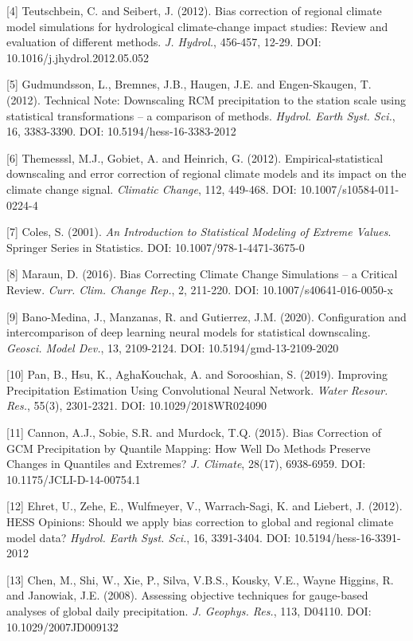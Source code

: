 \documentclass[
]{article}
\begin{document}
{[}4{]} Teutschbein, C. and Seibert, J. (2012). Bias correction of
regional climate model simulations for hydrological climate-change
impact studies: Review and evaluation of different methods. \emph{J.
Hydrol.}, 456-457, 12-29. DOI: 10.1016/j.jhydrol.2012.05.052

{[}5{]} Gudmundsson, L., Bremnes, J.B., Haugen, J.E. and Engen-Skaugen,
T. (2012). Technical Note: Downscaling RCM precipitation to the station
scale using statistical transformations -- a comparison of methods.
\emph{Hydrol. Earth Syst. Sci.}, 16, 3383-3390. DOI:
10.5194/hess-16-3383-2012

{[}6{]} Themesssl, M.J., Gobiet, A. and Heinrich, G. (2012).
Empirical-statistical downscaling and error correction of regional
climate models and its impact on the climate change signal.
\emph{Climatic Change}, 112, 449-468. DOI: 10.1007/s10584-011-0224-4

{[}7{]} Coles, S. (2001). \emph{An Introduction to Statistical Modeling
of Extreme Values}. Springer Series in Statistics. DOI:
10.1007/978-1-4471-3675-0

{[}8{]} Maraun, D. (2016). Bias Correcting Climate Change Simulations --
a Critical Review. \emph{Curr. Clim. Change Rep.}, 2, 211-220. DOI:
10.1007/s40641-016-0050-x

{[}9{]} Bano-Medina, J., Manzanas, R. and Gutierrez, J.M. (2020).
Configuration and intercomparison of deep learning neural models for
statistical downscaling. \emph{Geosci. Model Dev.}, 13, 2109-2124. DOI:
10.5194/gmd-13-2109-2020

{[}10{]} Pan, B., Hsu, K., AghaKouchak, A. and Sorooshian, S. (2019).
Improving Precipitation Estimation Using Convolutional Neural Network.
\emph{Water Resour. Res.}, 55(3), 2301-2321. DOI: 10.1029/2018WR024090

{[}11{]} Cannon, A.J., Sobie, S.R. and Murdock, T.Q. (2015). Bias
Correction of GCM Precipitation by Quantile Mapping: How Well Do Methods
Preserve Changes in Quantiles and Extremes? \emph{J. Climate}, 28(17),
6938-6959. DOI: 10.1175/JCLI-D-14-00754.1

{[}12{]} Ehret, U., Zehe, E., Wulfmeyer, V., Warrach-Sagi, K. and
Liebert, J. (2012). HESS Opinions: Should we apply bias correction to
global and regional climate model data? \emph{Hydrol. Earth Syst. Sci.},
16, 3391-3404. DOI: 10.5194/hess-16-3391-2012

{[}13{]} Chen, M., Shi, W., Xie, P., Silva, V.B.S., Kousky, V.E., Wayne
Higgins, R. and Janowiak, J.E. (2008). Assessing objective techniques
for gauge-based analyses of global daily precipitation. \emph{J.
Geophys. Res.}, 113, D04110. DOI: 10.1029/2007JD009132
\end{document}

